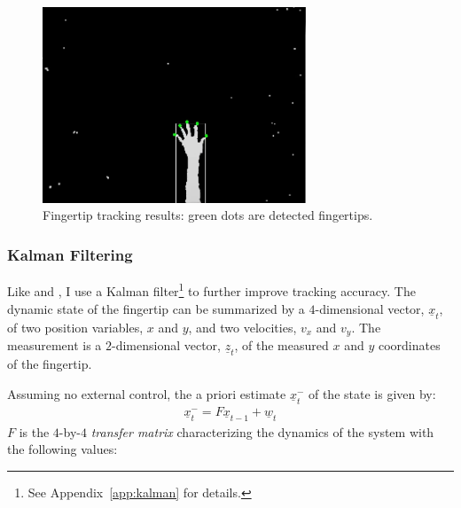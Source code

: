 \begin{figure}[tbh]
\centering
\includegraphics[width=0.7\textwidth]{figures/five_fingers.PNG}
\caption{Fingertip tracking results: green dots are detected fingertips.}
\label{fig:five-finger}
\end{figure}

\subsubsection{Kalman Filtering}
Like \cite{Oka02} and \cite{harrison11}, I use a Kalman filter\footnote{See
Appendix~\ref{app:kalman} for details.} to further improve tracking accuracy.
The dynamic state of the fingertip can be summarized by a $4$-dimensional vector,
$\underline{x}_t$, of two position variables, $x$ and $y$, and two velocities,
$v_x$ and $v_y$. The measurement is a $2$-dimensional vector, $\underline{z}_t$,
of the measured $x$ and $y$ coordinates of the fingertip.

Assuming no external control, the a priori estimate $\underline{x}_t^-$ of the
state is given by:
\begin{align*}
\underline{x}_t^- = F\underline{x}_{t - 1} + \underline{w}_t
\end{align*}
$F$ is the $4$-by-$4$ \textit{transfer matrix} characterizing the
dynamics of the system with the following values:

